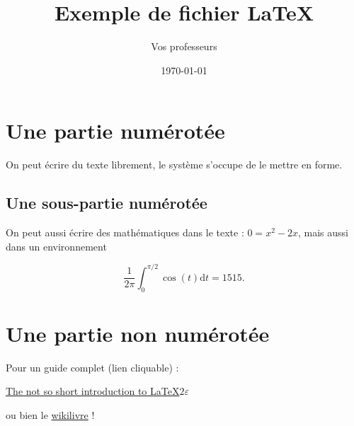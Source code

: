\documentclass[a4paper,11pt]{scrartcl} %
\author{Vos professeurs}
\date{\today}
\title{Exemple de fichier \LaTeX}
\begin{document}
\maketitle{}

\section{Une partie numérotée}

On peut écrire du texte librement, le système s'occupe de le mettre en forme. 

\subsection{Une sous-partie numérotée}

On peut aussi écrire des mathématiques dans le texte : $0 = x^2 - 2x$, mais aussi dans un environnement

\begin{equation*}
	\frac{1}{2\pi} \int_0^{\pi/2} \cos(t)\mathrm{d}t = 1515. 
\end{equation*}

\section*{Une partie non numérotée}

Pour un guide complet (lien cliquable) : 

\begin{center}
	\href{http://mirrors.ctan.org/info/lshort/english/lshort.pdf}{The not so short introduction to \LaTeX$2\varepsilon$}
\end{center}
ou bien le \href{https://en.wikibooks.org/wiki/LaTeX}{wikilivre} !
\end{document}

